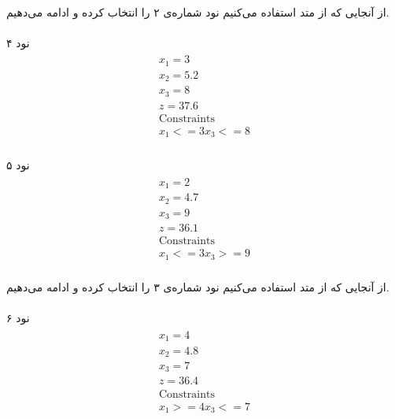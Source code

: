 \documentclass[paper=a4, fontsize=11pt]{article}
\numberwithin{equation}{section} %
\numberwithin{figure}{section} %
\numberwithin{table}{section} %
\begin{document}
\paragraph{}
از آنجایی که از متد  استفاده می‌کنیم
نود شماره‌ی ۲ را انتخاب کرده و ادامه می‌دهیم.

\paragraph{}
نود ۴
\begin{align}
\begin{split}
	x_1 = 3\\
	x_2 = 5.2\\
	x_3 = 8\\
	z = 37.6\\
	\text{Constraints}\\
	x_1 <= 3
	x_3 <= 8
\end{split}
\end{align}

\paragraph{}
نود ۵
\begin{align}
\begin{split}
	x_1 = 2\\
	x_2 = 4.7\\
	x_3 = 9\\
	z = 36.1\\
	\text{Constraints}\\
	x_1 <= 3
	x_3 >= 9
\end{split}
\end{align}

\paragraph{}
از آنجایی که از متد  استفاده می‌کنیم
نود شماره‌ی ۳ را انتخاب کرده و ادامه می‌دهیم.

\paragraph{}
نود ۶
\begin{align}
\begin{split}
	x_1 = 4\\
	x_2 = 4.8\\
	x_3 = 7\\
	z = 36.4\\
	\text{Constraints}\\
	x_1 >= 4
	x_3 <= 7
\end{split}
\end{align}
\end{document}
